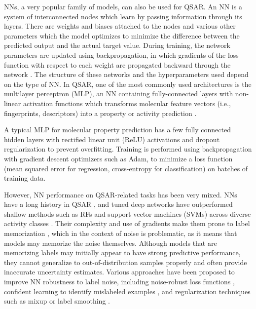 NNs, a very popular family of models, can also be used for QSAR. An NN is a system of interconnected nodes which learn by passing information through its layers. There are weights and biases attached to the nodes and various other parameters which the model optimizes to minimize the difference between the predicted output and the actual target value. During training, the network parameters are updated using backpropagation, in which gradients of the loss function with respect to each weight are propagated backward through the network \citep{Rumelhart1986}. The structure of these networks and the hyperparameters used depend on the type of NN. In QSAR, one of the most commonly used architectures is the multilayer perceptron (MLP), an NN containing fully-connected layers with non-linear activation functions which transforms molecular feature vectors (i.e., fingerprints, descriptors) into a property or activity prediction \citep{Ma2015}.

A typical MLP for molecular property prediction has a few fully connected hidden layers with rectified linear unit (ReLU) activations and dropout regularization to prevent overfitting. Training is performed using backpropagation with gradient descent optimizers such as Adam, to minimize a loss function (mean squared error for regression, cross-entropy for classification) on batches of training data. 

However, NN performance on QSAR-related tasks has been very mixed. NNs have a long history in QSAR \citep{Baskin2008}, and tuned deep networks have outperformed shallow methods such as RFs and support vector machines (SVMs) across diverse activity classes \citep{Koutsoukas2017}. Their complexity and use of gradients make them prone to label memorization \citep{Zhang2017}, which in the context of noise is problematic, as it means that models may memorize the noise themselves. Although models that are memorizing labels may initially appear to have strong predictive performance, they cannot generalize to out-of-distribution samples properly and often provide inaccurate uncertainty estimates. Various approaches have been proposed to improve NN robustness to label noise, including noise-robust loss functions \citep{Song2022}, confident learning to identify mislabeled examples \citep{Northcutt2021}, and regularization techniques such as mixup \citep{Zhang2018mixup} or label smoothing \citep{Szegedy2015}. 

